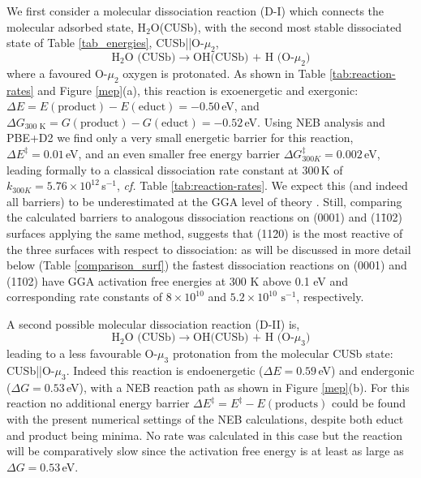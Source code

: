 \documentclass[twoside,twocolumn,9pt]{article}
\begin{document}
We first consider a molecular dissociation reaction (D-I) which connects 
 the molecular adsorbed state, H$_2$O(CUSb), with the second most 
 stable dissociated state of Table \ref{tab_energies},  CUSb||O-$\mu_2$,
%
\begin{equation}
 \mbox{H$_2$O (CUSb)}  \rightarrow  \mbox{OH(CUSb) + H (O-$\mu_2$)} \tag{D-I}
\label{diss1}
\end{equation}
%
where a favoured O-$\mu_2$ oxygen is protonated. As shown in Table \ref{tab:reaction-rates} and Figure \ref{mep}(a), this reaction is exoenergetic and exergonic: $\Delta E = E(\text{product})-E(\text{educt})= -0.50\,$eV, and $\Delta G_{\text{300 K}}= G(\text{product})-G(\text{educt})=-0.52\,$eV. Using 
 NEB analysis and PBE+D2 we find only 
 a very small energetic barrier for this reaction, $\Delta E^\ddagger=0.01\,$eV, 
  and an even smaller free energy barrier $\Delta G^\ddagger_{300K}=0.002\,$eV, leading 
 formally to a classical  
 dissociation rate constant at $300\,$K of $k_{300K}=5.76\times 10^{12}\,$s$^{-1}$, {\it cf.} Table \ref{tab:reaction-rates}.
 We expect this (and indeed all barriers) to be underestimated at the GGA level of theory \cite{Zhao05}.
 Still, comparing 
 the calculated  barriers to analogous dissociation reactions on (0001) and (1\=102) surfaces 
 applying the same method,
 suggests that (11\=20) is the most reactive of the three surfaces \cite{Wirth12,wirth2016characterization} with respect to 
dissociation: as will be discussed in more detail below (Table 
 \ref{comparison_surf}) the fastest dissociation reactions on (0001) and (1\=102) have 
 GGA activation free energies at 300 K above 0.1 eV and 
 corresponding rate constants of $8\times10^{10}$ and $5.2\times10^{10}\text{ s}^{-1}$, respectively.

A second possible molecular dissociation reaction (D-II) is,
%
\begin{equation}
 \mbox{H$_2$O (CUSb)}  \rightarrow  \mbox{OH(CUSb) + H (O-$\mu_3$)} \tag{D-II}
\label{diss2}
\end{equation}
%
leading to a less favourable O-$\mu_3$ protonation from the molecular CUSb state: CUSb||O-$\mu_3$. Indeed 
this reaction is endoenergetic ($\Delta E=0.59\,$eV) and endergonic ($\Delta G=0.53\,$eV), with 
 a NEB reaction path as shown in Figure \ref{mep}(b). For this reaction no additional 
 energy barrier $\Delta E^\ddagger=E^\ddagger-E(\mbox{products})$ could be found with the present numerical settings of the NEB calculations, despite both educt and product being minima. No rate was calculated in this case but the reaction will 
 be comparatively 
 slow since the activation free energy is at least as large as $\Delta G=0.53\,$eV.
\end{document}
